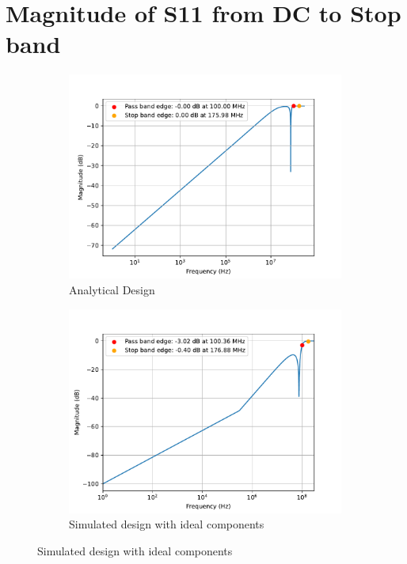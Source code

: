 \documentclass[letterpaper,12pt]{article}
\begin{document}
\section{Magnitude of S11 from DC to Stop band}
\begin{figure}[H]
    \begin{subfigure}[t]{.49\textwidth}
      \centering
      \includegraphics[width=\linewidth]{figures/7.analytical}
      \caption{Analytical Design}
    \end{subfigure}
    \hfill
    \begin{subfigure}[t]{.49\textwidth}
      \centering
      \includegraphics[width=\linewidth]{figures/7.ideal}
      \caption{Simulated design with ideal components}
    \end{subfigure}
  

\end{figure}
\end{document}
